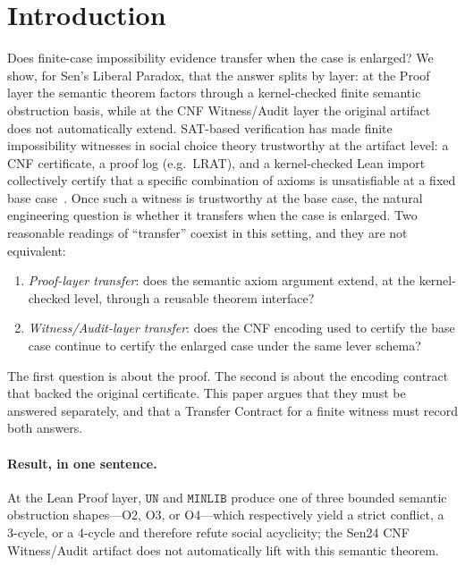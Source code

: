 \section{Introduction}
\label{sec:intro}

Does finite-case impossibility evidence transfer when the case is enlarged?
We show, for Sen's Liberal Paradox, that the answer splits by layer: at the Proof layer the semantic theorem factors through a kernel-checked finite semantic obstruction basis, while at the CNF Witness/Audit layer the original artifact does not automatically extend.
SAT-based verification has made finite impossibility witnesses in social choice theory trustworthy at the artifact level: a CNF certificate, a proof log (e.g.\ LRAT), and a kernel-checked Lean import collectively certify that a specific combination of axioms is unsatisfiable at a fixed base case~\citep{tanglin2009computer,geist2011automated,brandtgeist2016strategyproof}.
Once such a witness is trustworthy at the base case, the natural engineering question is whether it transfers when the case is enlarged.
Two reasonable readings of ``transfer'' coexist in this setting, and they are not equivalent:
\begin{enumerate}[label=(\arabic*),leftmargin=1.8em]
\item \emph{Proof-layer transfer}: does the semantic axiom argument extend, at the kernel-checked level, through a reusable theorem interface?
\item \emph{Witness/Audit-layer transfer}: does the CNF encoding used to certify the base case continue to certify the enlarged case under the same lever schema?
\end{enumerate}
The first question is about the proof. The second is about the encoding contract that backed the original certificate. This paper argues that they must be answered separately, and that a Transfer Contract for a finite witness must record both answers.

\paragraph{Result, in one sentence.}
At the Lean Proof layer, \(\mathtt{UN}\) and \(\mathtt{MINLIB}\) produce one of three bounded semantic obstruction shapes---O2, O3, or O4---which respectively yield a strict conflict, a 3-cycle, or a 4-cycle and therefore refute social acyclicity; the Sen24 CNF Witness/Audit artifact does not automatically lift with this semantic theorem.

